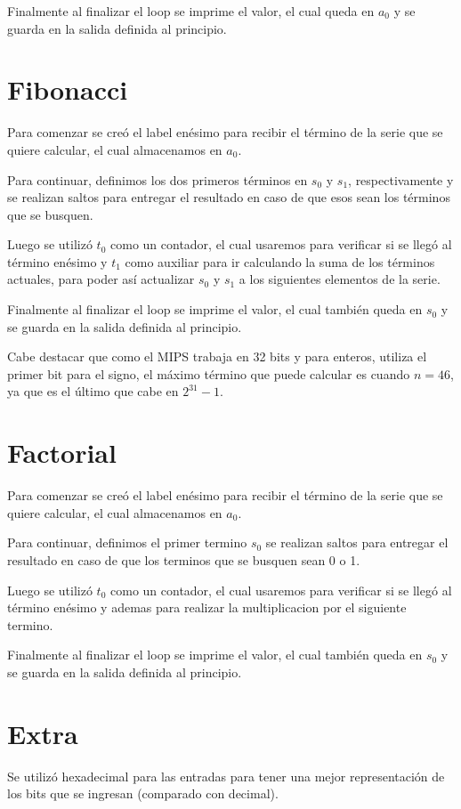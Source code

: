 \documentclass[11pt,letterpaper]{article}
\begin{document}
Finalmente al finalizar el loop se imprime el valor, el cual queda en $a_0$ y se guarda en la salida definida al principio.


\section{Fibonacci}
Para comenzar se creó el label enésimo para recibir el término de la serie que se quiere calcular, el cual almacenamos en $a_0$. 

Para continuar, definimos los dos primeros términos en $s_0$ y $s_1$, respectivamente y se realizan saltos para entregar el resultado en caso de que esos sean los términos que se busquen.

Luego se utilizó $t_0$ como un contador, el cual usaremos para verificar si se llegó al término enésimo y $t_1$ como auxiliar para ir calculando la suma de los términos actuales, para poder así actualizar $s_0$ y $s_1$ a los siguientes elementos de la serie.

Finalmente al finalizar el loop se imprime el valor, el cual también queda en $s_0$ y se guarda en la salida definida al principio.

Cabe destacar que como el MIPS trabaja en 32 bits y para enteros, utiliza el primer bit para el signo, el máximo término que puede calcular es cuando $n=46$, ya que es el último que cabe en $2^{31}-1$.

\section{Factorial}
Para comenzar se creó el label enésimo para recibir el término de la serie que se quiere calcular, el cual almacenamos en $a_0$. 

Para continuar, definimos el primer termino  $s_0$ se realizan saltos para entregar el resultado en caso de que los terminos que se busquen sean 0 o 1.

Luego se utilizó $t_0$ como un contador, el cual usaremos para verificar si se llegó al término enésimo y ademas para realizar la multiplicacion por el siguiente termino.

Finalmente al finalizar el loop se imprime el valor, el cual también queda en $s_0$ y se guarda en la salida definida al principio.



\section{Extra}
Se utilizó hexadecimal para las entradas para tener una mejor representación de los bits que se ingresan (comparado con decimal). 
\end{document}
